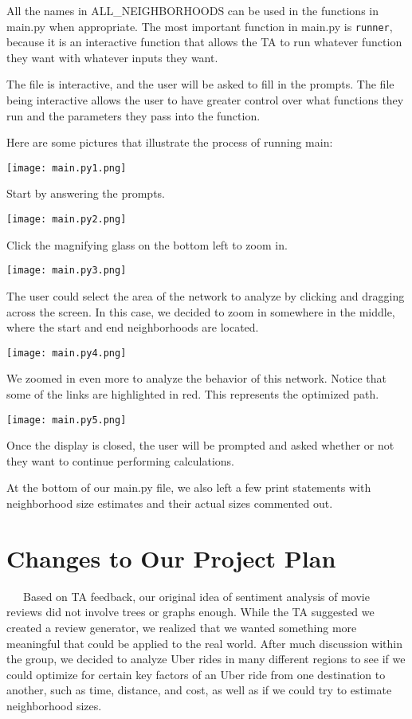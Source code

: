\documentclass[fontsize=11pt]{article}
\begin{document}
All the names in ALL\_NEIGHBORHOODS can be used in the functions in main.py when appropriate. The most important function in main.py is \texttt{runner}, because it is an interactive function that allows the TA to run whatever function they want with whatever inputs they want. \newline

The file is interactive, and the user will be asked to fill in the prompts. The file being interactive allows the user to have greater control over what functions they run and the parameters they pass into the function. \newline

Here are some pictures that illustrate the process of running main:
\begin{center}
\texttt{[image: main.py1.png]}
\end{center}
Start by answering the prompts.
\begin{center}
\texttt{[image: main.py2.png]}
\end{center}
Click the magnifying glass on the bottom left to zoom in.
\begin{center}
\texttt{[image: main.py3.png]}
\end{center}
The user could select the area of the network to analyze by clicking and dragging across the screen. In this case, we decided to zoom in somewhere in the middle, where the start and end neighborhoods are located.
\begin{center}
\texttt{[image: main.py4.png]}
\end{center}
We zoomed in even more to analyze the behavior of this network. Notice that some of the links are highlighted in red. This represents the optimized path.
\begin{center}
\texttt{[image: main.py5.png]}
\end{center}
Once the display is closed, the user will be prompted and asked whether or not they want to continue performing calculations. \newline

At the bottom of our main.py file, we also left a few print statements with neighborhood size estimates and their actual sizes commented out.

\section*{Changes to Our Project Plan}

\ \ \ Based on TA feedback, our original idea of sentiment analysis of movie reviews did not involve trees or graphs enough. While the TA suggested we created a review generator, we realized that we wanted something more meaningful that could be applied to the real world. After much discussion within the group, we decided to analyze Uber rides in many different regions to see if we could optimize for certain key factors of an Uber ride from one destination to another, such as time, distance, and cost, as well as if we could try to estimate neighborhood sizes. 
\end{document}
